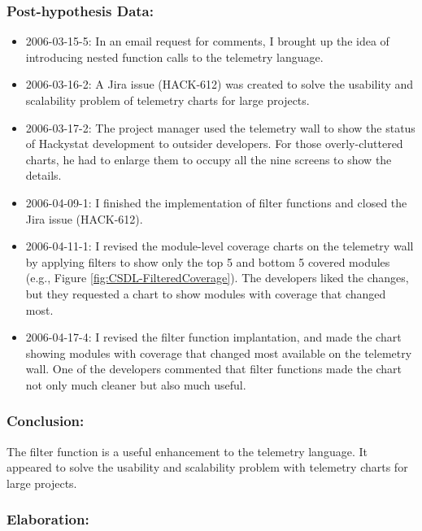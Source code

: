 \subsubsection{Post-hypothesis Data:}
\begin{itemize}
  \setlength{\itemsep}{0pt}
  \setlength{\parskip}{0pt}
  \item 2006-03-15-5: In an email request for comments, I brought up the idea of introducing nested function calls to the telemetry language.
  \item 2006-03-16-2: A Jira issue (HACK-612) was created to solve the usability and scalability problem of telemetry charts for large projects.
  \item 2006-03-17-2: The project manager used the telemetry wall to show the status of Hackystat development to outsider developers. For those overly-cluttered charts, he had to enlarge them to occupy all the nine screens to show the details.
  \item 2006-04-09-1: I finished the implementation of filter functions and closed the Jira issue (HACK-612).
  \item 2006-04-11-1: I revised the module-level coverage charts on the telemetry wall by applying filters to show only the top 5 and bottom 5 covered modules (e.g., Figure \ref{fig:CSDL-FilteredCoverage}). The developers liked the changes, but they requested a chart to show modules with coverage that changed most.
  \item 2006-04-17-4: I revised the filter function implantation, and made the chart showing modules with coverage that changed most available on the telemetry wall. One of the developers commented that filter functions made the chart not only much cleaner but also much useful. 
\end{itemize}

\subsubsection{Conclusion:}

The filter function is a useful enhancement to the telemetry language. It appeared to solve the usability and scalability problem with telemetry charts for large projects. 

\subsubsection{Elaboration:}

